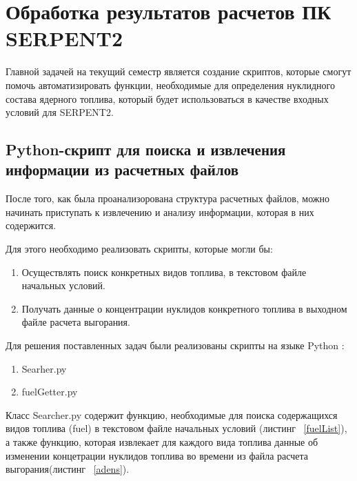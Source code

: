 
\section{Обработка результатов расчетов ПК SERPENT2}

Главной задачей на текущий семестр является создание скриптов, которые смогут помочь автоматизировать функции, необходимые для определения нуклидного состава ядерного топлива, который будет использоваться в качестве входных условий для SERPENT2. 

\subsection{Python-скрипт для поиска и извлечения информации из расчетных файлов}

После того, как была проанализорована структура расчетных файлов, можно начинать приступать к извлечению и анализу информации, которая в них содержится.

Для этого необходимо реализовать скрипты, которые могли бы:

\begin{enumerate}
	\item Осуществлять поиск конкретных видов топлива, в текстовом файле начальных условий.
	\item Получать данные о концентрации нуклидов конкретного топлива в выходном файле расчета выгорания.
\end{enumerate}

Для решения поставленных задач были реализованы скрипты на языке Python \cite{python}:

\begin{enumerate}
	\item Searher.py
	\item fuelGetter.py
\end{enumerate}

Класс Searcher.py содержит функцию, необходимые для поиска содержащихся видов топлива (fuel) в текстовом файле начальных условий (листинг ~\ref{fuelList}), а также  функцию, которая извлекает для каждого вида топлива данные об изменении концетрации нуклидов топлива во времени из файла расчета выгорания(листинг ~\ref{adens}). 



